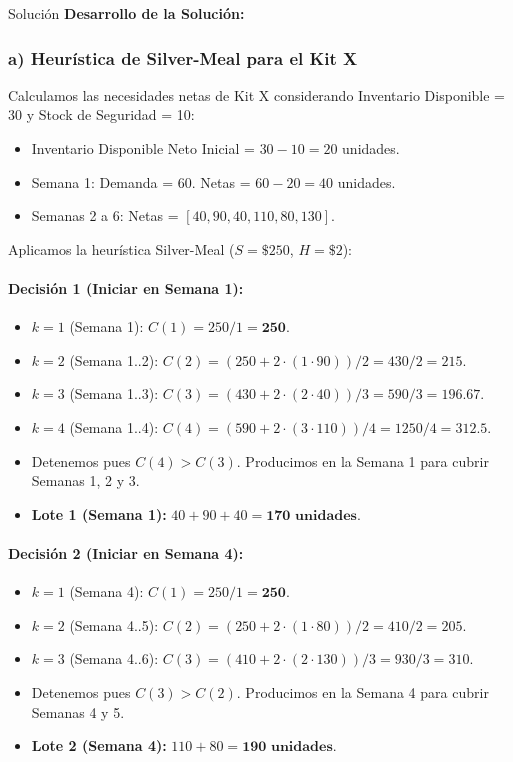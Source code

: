\documentclass[11pt, a4paper]{article}
\begin{document}
  \medskip
  \begin{ejercicio}{Solución}
  \textbf{Desarrollo de la Solución:}

  \subsubsection*{a) Heurística de Silver-Meal para el Kit X}
  Calculamos las necesidades netas de Kit X considerando Inventario Disponible = 30 y Stock de Seguridad = 10:
  \begin{itemize}
    \item Inventario Disponible Neto Inicial = $30 - 10 = 20$ unidades.
    \item Semana 1: Demanda = 60. Netas = $60 - 20 = 40$ unidades.
    \item Semanas 2 a 6: Netas = $[40, 90, 40, 110, 80, 130]$.
  \end{itemize}

  Aplicamos la heurística Silver-Meal ($S = \$250$, $H = \$2$):

  \paragraph{Decisión 1 (Iniciar en Semana 1):}
  \begin{itemize}
    \item $k=1$ (Semana 1): $C(1) = 250 / 1 = \mathbf{250}$.
    \item $k=2$ (Semana 1..2): $C(2) = (250 + 2 \cdot (1 \cdot 90)) / 2 = 430 / 2 = 215$.
    \item $k=3$ (Semana 1..3): $C(3) = (430 + 2 \cdot (2 \cdot 40)) / 3 = 590 / 3 = 196.67$.
    \item $k=4$ (Semana 1..4): $C(4) = (590 + 2 \cdot (3 \cdot 110)) / 4 = 1250 / 4 = 312.5$.
    \item Detenemos pues $C(4) > C(3)$. Producimos en la Semana 1 para cubrir Semanas 1, 2 y 3.
    \item \textbf{Lote 1 (Semana 1):} $40 + 90 + 40 = \mathbf{170 \text{ unidades}}$.
  \end{itemize}

  \paragraph{Decisión 2 (Iniciar en Semana 4):}
  \begin{itemize}
    \item $k=1$ (Semana 4): $C(1) = 250 / 1 = \mathbf{250}$.
    \item $k=2$ (Semana 4..5): $C(2) = (250 + 2 \cdot (1 \cdot 80)) / 2 = 410 / 2 = 205$.
    \item $k=3$ (Semana 4..6): $C(3) = (410 + 2 \cdot (2 \cdot 130)) / 3 = 930 / 3 = 310$.
    \item Detenemos pues $C(3) > C(2)$. Producimos en la Semana 4 para cubrir Semanas 4 y 5.
    \item \textbf{Lote 2 (Semana 4):} $110 + 80 = \mathbf{190 \text{ unidades}}$.
  \end{itemize}


\end{ejercicio}
\end{document}
